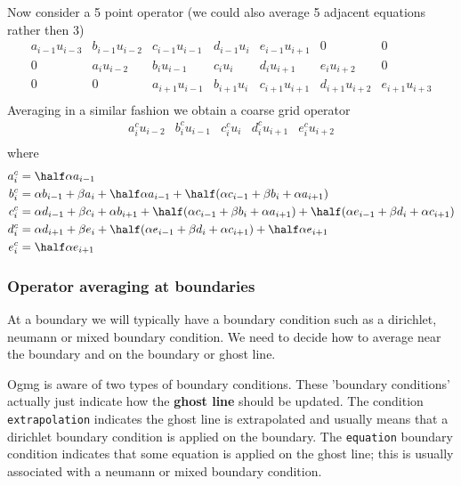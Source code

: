 \documentclass[11pt]{article}
\begin{document}
Now consider a 5 point operator (we could also average 5 adjacent equations rather then 3)
\[
   \begin{matrix}
a_{i-1}u_{i-3}& b_{i-1}u_{i-2}& c_{i-1} u_{i-1}& d_{i-1} u_{i} & e_{i-1} u_{i+1} &  0              & 0 \\
    0         & a_i u_{i-2}   & b_i u_{i-1}    & c_i u_{i  }   & d_{i  } u_{i+1} & e_{i  } u_{i+2} & 0\\
    0         &       0       & a_{i+1} u_{i-1}& b_{i+1}u_{i}  & c_{i+1}u_{i+1}  & d_{i+1} u_{i+2} & e_{i+1} u_{i+3} \\
    \end{matrix}
\]
Averaging in a similar fashion we obtain a coarse grid operator
\[
   \begin{matrix}
    a_i^c u_{i-2}   & b_i^c u_{i-1}    & c_i^c u_{i}  & d_{i}^c u_{i+1} & e_{i}^c u_{i+2} \\
    \end{matrix}
\]
where
\begin{align*}
   a_i^c &= \half\alpha a_{i-1} \\  
   b_i^c &=  \alpha b_{i-1} + \beta a_i + \half \alpha a_{i-1}+
                \half( \alpha c_{i-1} + \beta b_i + \alpha a_{i+1} )      \\
   c_i^c &= \alpha d_{i-1} + \beta c_i +\alpha b_{i+1} +
               \half( \alpha c_{i-1} + \beta b_i + \alpha a_{i+1} ) +
               \half( \alpha e_{i-1} + \beta d_i + \alpha c_{i+1} ) \\
   d_i^c &=  \alpha d_{i+1} + \beta e_i +
              \half( \alpha e_{i-1} + \beta d_i + \alpha c_{i+1} ) +
               \half\alpha e_{i+1} \\
   e_i^c &= \half\alpha e_{i+1} \\  
\end{align*}


\subsubsection{Operator averaging at boundaries}

   At a boundary we will typically have a boundary condition such as a dirichlet, neumann or mixed boundary
condition. We need to decide how to average near the boundary and on the boundary or ghost line.

Ogmg is aware of two types of boundary conditions. These 'boundary conditions' actually
just indicate how the {\bf ghost line} should be updated. The condition {\tt extrapolation} indicates the 
ghost line is extrapolated and usually means that a dirichlet boundary condition is applied on
the boundary. The {\tt equation} boundary condition indicates that some equation is applied on
the ghost line; this is usually associated with a neumann or mixed boundary condition.
\end{document}
